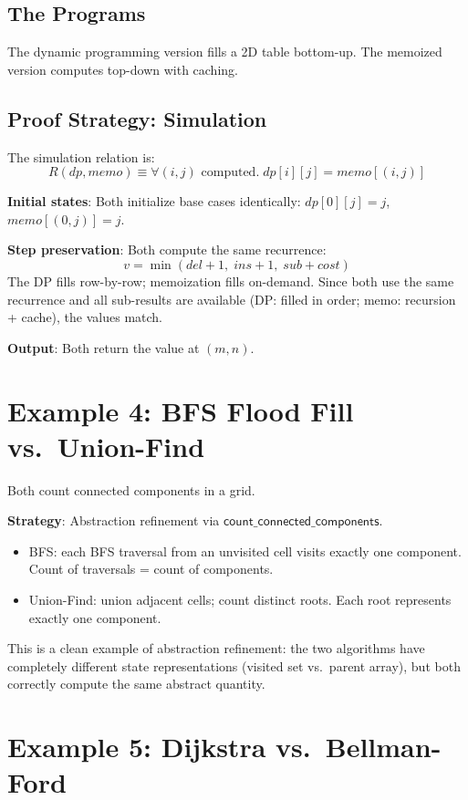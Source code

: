 \subsection{The Programs}
The dynamic programming version fills a 2D table bottom-up.
The memoized version computes top-down with caching.

\subsection{Proof Strategy: Simulation}

The simulation relation is:
\[
  R(\mathit{dp}, \mathit{memo}) \equiv
  \forall (i,j) \text{ computed}.\;
  \mathit{dp}[i][j] = \mathit{memo}[(i,j)]
\]

\textbf{Initial states}: Both initialize base cases identically:
$\mathit{dp}[0][j] = j$, $\mathit{memo}[(0,j)] = j$.

\textbf{Step preservation}: Both compute the same recurrence:
\[
  v = \min(\mathit{del} + 1,\; \mathit{ins} + 1,\;
    \mathit{sub} + \mathit{cost})
\]
The DP fills row-by-row; memoization fills on-demand.  Since both
use the same recurrence and all sub-results are available (DP:
filled in order; memo: recursion + cache), the values match.

\textbf{Output}: Both return the value at $(m, n)$.


\section{Example 4: BFS Flood Fill vs.\ Union-Find}

Both count connected components in a grid.

\textbf{Strategy}: Abstraction refinement via
$\mathsf{count\_connected\_components}$.

\begin{itemize}
\item BFS: each BFS traversal from an unvisited cell visits exactly one
  component.  Count of traversals = count of components.
\item Union-Find: union adjacent cells; count distinct roots.  Each root
  represents exactly one component.
\end{itemize}

This is a clean example of abstraction refinement: the two algorithms
have completely different state representations (visited set vs.\ parent
array), but both correctly compute the same abstract quantity.


\section{Example 5: Dijkstra vs.\ Bellman-Ford}

